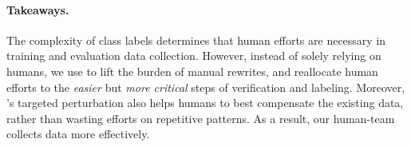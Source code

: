 





\paragraph{Takeaways.}
The complexity of class labels determines that human efforts are necessary in training and evaluation data collection.
However, instead of solely relying on humans, we use \sysname to lift the burden of manual rewrites, and reallocate human efforts to the \emph{easier} but \emph{more critical} steps of verification and labeling.
Moreover, \sysname's targeted perturbation also helps humans to best compensate the existing data, rather than wasting efforts on repetitive patterns.
As a result, our human-\sysname team collects data more effectively.


